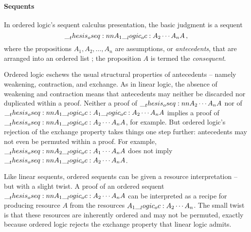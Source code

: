 \paragraph{Seq\-uents}
In ordered logic's sequent calculus presentation, the basic judgment is a sequent
\begin{equation*}
  \oseq{A_1 \oc A_2 \dotsb A_n |- A} \,,
\end{equation*}
where the propositions $A_1, A_2, \dotsc, A_n$ are assumptions, or \emph{antecedents}, that are arranged into an ordered list%
; the proposition $A$ is termed the \emph{consequent}.

Ordered logic eschews the usual structural properties of antecedents -- namely weakening, contraction, and exchange.
As in linear logic, the absence of weakening and contraction means that
antecedents
may neither be discarded nor duplicated within a proof.
Neither a proof of $\oseq{A_2 \dotsb A_n |- A}$ nor of $\oseq{A_1 \oc A_1 \oc A_2 \dotsb A_n |- A}$ implies a proof of $\oseq{A_1 \oc A_2 \dotsb A_n |- A}$, for example.
But ordered logic's rejection of the exchange property takes things one step further: antecedents may not even be permuted within a proof.
For example, $\oseq{A_2 \oc A_1 \dotsb A_n |- A}$ does not imply $\oseq{A_1 \oc A_2 \dotsb A_n |- A}$.

Like linear sequents\autocite{Girard:TCS87}, ordered sequents can be given a resource interpretation -- but with a slight twist.
A proof of an ordered sequent
$\oseq{A_1 \oc A_2 \dotsb A_n |- A}$
can be interpreted as a recipe for producing resource $A$ from the resources $A_1 \__logic_oc: A_2 \dotsb A_n$.
The small twist is that these resources are inherently ordered and may not be permuted, exactly because ordered logic rejects the exchange property that linear logic admits.

